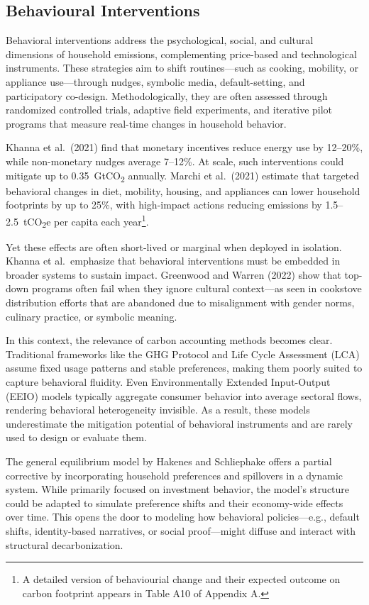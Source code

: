 \documentclass[12pt,a4paper]{article}%
\begin{document}
\subsection{Behavioural Interventions}

Behavioral interventions address the psychological, social, and cultural dimensions of household emissions, complementing price-based and technological instruments. These strategies aim to shift routines---such as cooking, mobility, or appliance use---through nudges, symbolic media, default-setting, and participatory co-design. Methodologically, they are often assessed through randomized controlled trials, adaptive field experiments, and iterative pilot programs that measure real-time changes in household behavior.

Khanna et al.\ (2021) find that monetary incentives reduce energy use by 12--20\%, while non-monetary nudges average 7--12\%. At scale, such interventions could mitigate up to 0.35~GtCO\textsubscript{2} annually. Marchi et al.\ (2021) estimate that targeted behavioral changes in diet, mobility, housing, and appliances can lower household footprints by up to 25\%, with high-impact actions reducing emissions by 1.5--2.5~tCO\textsubscript{2}e per capita each year\footnote{ A detailed version of behaviourial change and their expected outcome on carbon footprint appears in Table A10 of Appendix A.}.

Yet these effects are often short-lived or marginal when deployed in isolation. Khanna et al.\ emphasize that behavioral interventions must be embedded in broader systems to sustain impact. Greenwood and Warren (2022) show that top-down programs often fail when they ignore cultural context---as seen in cookstove distribution efforts that are abandoned due to misalignment with gender norms, culinary practice, or symbolic meaning.

In this context, the relevance of carbon accounting methods becomes clear. Traditional frameworks like the GHG Protocol and Life Cycle Assessment (LCA) assume fixed usage patterns and stable preferences, making them poorly suited to capture behavioral fluidity. Even Environmentally Extended Input-Output (EEIO) models typically aggregate consumer behavior into average sectoral flows, rendering behavioral heterogeneity invisible. As a result, these models underestimate the mitigation potential of behavioral instruments and are rarely used to design or evaluate them.

The general equilibrium model by Hakenes and Schliephake offers a partial corrective by incorporating household preferences and spillovers in a dynamic system. While primarily focused on investment behavior, the model’s structure could be adapted to simulate preference shifts and their economy-wide effects over time. This opens the door to modeling how behavioral policies---e.g., default shifts, identity-based narratives, or social proof---might diffuse and interact with structural decarbonization.
\end{document}
